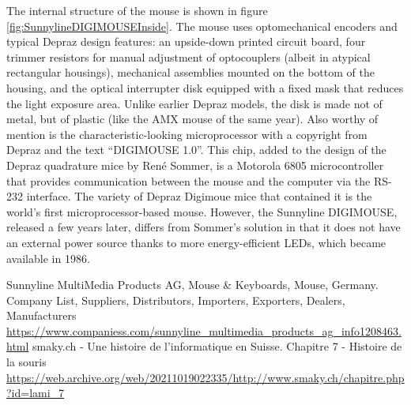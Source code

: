\documentclass[11pt, a4paper]{article}
\begin{document}
The internal structure of the mouse is shown in figure \ref{fig:SunnylineDIGIMOUSEInside}. The mouse uses optomechanical encoders and typical Depraz design features: an upside-down printed circuit board, four trimmer resistors for manual adjustment of optocouplers (albeit in atypical rectangular housings), mechanical assemblies mounted on the bottom of the housing, and the optical interrupter disk equipped with a fixed mask that reduces the light exposure area. Unlike earlier Depraz models, the disk is made not of metal, but of plastic (like the AMX mouse of the same year). Also worthy of mention is the characteristic-looking microprocessor with a copyright from Depraz and the text ``DIGIMOUSE 1.0''. This chip, added to the design of the Depraz quadrature mice by Ren\'e Sommer, is a Motorola 6805 microcontroller that provides communication between the mouse and the computer via the RS-232 interface. The variety of Depraz Digimoue mice that contained it is the world's first microprocessor-based \cite{smaky} mouse. However, the Sunnyline DIGIMOUSE, released a few years later, differs from Sommer's solution in that it does not have an external power source thanks to more energy-efficient LEDs, which became available in 1986.

\begin{thebibliography}{9}
 Sunnyline MultiMedia Products AG, Mouse \& Keyboards, Mouse, Germany. Company List, Suppliers, Distributors, Importers, Exporters, Dealers, Manufacturers \url{https://www.companiess.com/sunnyline_multimedia_products_ag_info1208463.html}
 smaky.ch - Une histoire de l'informatique en Suisse. Chapitre 7 - Histoire de la souris \url{https://web.archive.org/web/20211019022335/http://www.smaky.ch/chapitre.php?id=lami_7}
\end{thebibliography}
\end{document}
